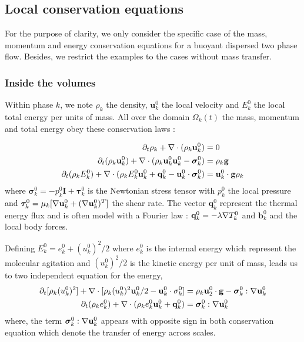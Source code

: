 \subsection{Local conservation equations}
\label{sec:local_eq}

For the purpose of clarity, we only consider the specific case of the mass, momentum and energy conservation equations for a buoyant dispersed two phase flow.
Besides, we restrict the examples to the cases without mass transfer.

\subsubsection{Inside the volumes}
Within phase $k$, we note $\rho_k$ the density, $\textbf{u}_k^0$ the local velocity and $E_k^0$ the local total energy per units of mass.
All over the domain $\Omega_k(t)$ the mass, momentum and total energy obey these conservation laws :

\begin{align}
    \label{eq:dt_rho}
    \partial_t \rho_k  
    + \mathbf{\nabla}\cdot (
        \rho_k\textbf{u}_k^0
    )
    &= 
    0\\
    \label{eq:dt_rhou_k}
    \partial_t (\rho_k\textbf{u}_k^0)  
    + \mathbf{\nabla}\cdot (
        \rho_k\textbf{u}_k^0\textbf{u}_k^0
        - \bm{\sigma}_k^0 
    )
    &= 
    \rho_k \textbf{g}\\
    \label{eq:dt_rhoE_k}
    \partial_t (\rho_kE_k^0)  
    + \mathbf{\nabla}\cdot (
        \rho_kE_k^0\textbf{u}_k^0
        + \textbf{q}_k^0
        - \textbf{u}_k^0 \cdot \bm{\sigma}_k^0 
        )
    &= 
    \textbf{u}_k^0 \cdot \textbf{g}  \rho_k
\end{align} 
where $\bm{\sigma}_k^0 = - p_k^0 \textbf{I} + \bm{\tau}_k^0$ is the Newtonian stress tensor with $p_k ^0$ the local pressure and $\bm{\tau}_k^0 = \mu_k[\mathbf{\nabla} \textbf{u}_k^0+(\mathbf{\nabla} \textbf{u}_k^0)^T]$ the shear rate. 
The vector $\textbf{q}_k^0$ represent the thermal energy flux and is often model with a Fourier law : $\textbf{q}_k^0 = -\lambda \mathbf{\nabla} T_k^0$
and $\textbf{b}^0_k$  and the local body forces.

Defining $E_k^0 = e_k^0 + (u_k^0)^2/2$ where  $e_k^0$ is the internal energy which represent the molecular agitation and $(u_k^0)^2/2$ is the kinetic energy per unit of mass, leads us to two independent equation for the energy, 
\begin{align}
    \label{eq:dt_rhou_k2}
    \partial_t [\rho_k(u_k^0)^2]  
    + \mathbf{\nabla}\cdot [\rho_k(u_k^0)^2\textbf{u}_k^0/2 - \textbf{u}_k^0 \cdot \sigma_k^0]
    &=
    \rho_k\textbf{u}_2^0 \cdot \textbf{g}  
    -  \bm{\sigma}_k^0 : \mathbf{\nabla} \textbf{u}_k^0 
    \\
    \label{eq:dt_rhoe_k}
    \partial_t (\rho_ke_k^0)  
    + \mathbf{\nabla}\cdot (
        \rho_ke_k^0\textbf{u}_k^0
        + \textbf{q}_k^0
        )
    &= 
    \bm{\sigma}_k^0 : \mathbf{\nabla} \textbf{u}_k^0
\end{align} 
where, the term $\bm{\sigma}_k^0 : \mathbf{\nabla} \textbf{u}_k^0$ appears with opposite sign in both conservation equation which denote the transfer of energy across scales. 

